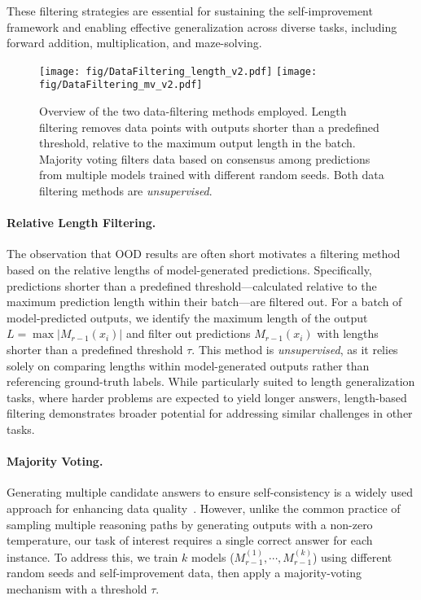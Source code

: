 These filtering strategies are essential for sustaining the self-improvement framework and enabling effective generalization across diverse tasks, including forward addition, multiplication, and maze-solving.

\begin{figure}[ht]
    \centering
    \texttt{[image: fig/DataFiltering\_length\_v2.pdf]}
    \hspace{0.03\linewidth}
    \texttt{[image: fig/DataFiltering\_mv\_v2.pdf]}
    \caption{Overview of the two data-filtering methods employed. Length filtering removes data points with outputs shorter than a predefined threshold, relative to the maximum output length in the batch. Majority voting filters data based on consensus among predictions from multiple models trained with different random seeds. Both data filtering methods are \textit{unsupervised}. }
    \label{fig:data_filtering}
\end{figure}

\paragraph{Relative Length Filtering. } 
The observation that OOD results are often short motivates a filtering method based on the relative lengths of model-generated predictions. Specifically, predictions shorter than a predefined threshold—calculated relative to the maximum prediction length within their batch—are filtered out. For a batch of model-predicted outputs, we identify the maximum length of the output $L=\max |M_{r-1}(x_i)|$ and filter out predictions $M_{r-1}(x_i)$ with lengths shorter than a predefined threshold $\tau$. This method is \textit{unsupervised}, as it relies solely on comparing lengths within model-generated outputs rather than referencing ground-truth labels. While particularly suited to length generalization tasks, where harder problems are expected to yield longer answers, length-based filtering demonstrates broader potential for addressing similar challenges in other tasks.













\paragraph{Majority Voting. } 
Generating multiple candidate answers to ensure self-consistency is a widely used approach for enhancing data quality~\citep{huang2022large,wang2022self,qu2024recursive,peng2024regenesis}. However, unlike the common practice of sampling multiple reasoning paths by generating outputs with a non-zero temperature, our task of interest requires a single correct answer for each instance. To address this, we train \( k \) models (\( M_{r-1}^{(1)}, \cdots , M_{r-1}^{(k)} \)) using different random seeds and self-improvement data, then apply a majority-voting mechanism with a threshold \( \tau \). 

